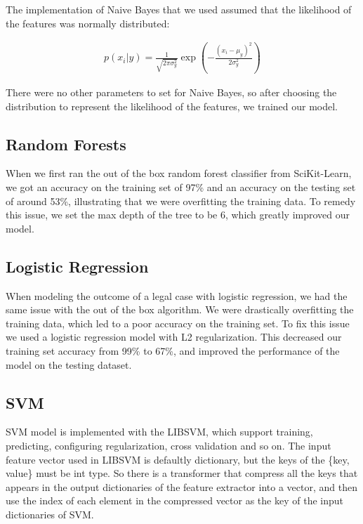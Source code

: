 \documentclass[journal]{IEEEtran}
\begin{document}
The implementation of Naive Bayes that we used assumed that the likelihood of the features was normally distributed:

\begin{equation}
\begin{aligned}
p(x_i | y) = \frac{1}{\sqrt{2 \pi \sigma_y^2}} \exp \left ( - \frac{(x_i - \mu_y)^2}{2\sigma_y^2}\right)
\end{aligned}
\end{equation}

There were no other parameters to set for Naive Bayes, so after choosing the distribution to represent the likelihood of the features, we trained our model.

\subsection{Random Forests}

When we first ran the out of the box random forest classifier from SciKit-Learn, we got an accuracy on the training set of 97\% and an accuracy on the testing set of around 53\%, illustrating that we were overfitting the training data. To remedy this issue, we set the max depth of the tree to be 6, which greatly improved our model. 

\subsection{Logistic Regression}

When modeling the outcome of a legal case with logistic regression, we had the same issue with the out of the box algorithm. We were drastically overfitting the training data, which led to a poor accuracy on the training set. To fix this issue we used a logistic regression model with L2 regularization. This decreased our training set accuracy from 99\% to 67\%, and improved the performance of the model on the testing dataset. 

\subsection{SVM}

SVM model is implemented with the LIBSVM, which support training, predicting, configuring regularization, cross validation and so on. The input feature vector used in LIBSVM is defaultly dictionary, but the keys of the \{key, value\} must be int type.
So there is a transformer that compress all the keys that appears in the output dictionaries of the feature extractor into a vector, and then use the index of each element in the compressed vector as the key of the input dictionaries of SVM. 
\end{document}
